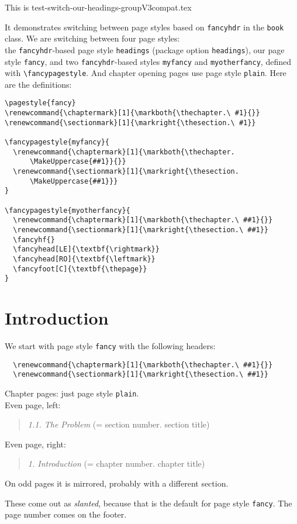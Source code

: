 \documentclass[openany]{book}
\renewcommand{\chaptermark}[1]{\markboth{\thechapter.\ #1}{}}
\renewcommand{\sectionmark}[1]{\markright{\thesection.\ #1}}
\renewcommand{\chaptermark}[1]{\markboth{\thechapter.
      \MakeUppercase{##1}}{}}
\renewcommand{\sectionmark}[1]{\markright{\thesection.
      \MakeUppercase{##1}}}
\renewcommand{\chaptermark}[1]{\markboth{\thechapter.\ ##1}{}}
\renewcommand{\sectionmark}[1]{\markright{\thesection.\ ##1}}
\begin{document}
\tableofcontents

\newpage
\thispagestyle{plain}

\noindent
\begin{boxedminipage}{\textwidth}
  This is test-switch-our-headings-groupV3compat.tex

It demonstrates switching between page styles based on
\texttt{fancyhdr} in the \texttt{book} class. We are switching between
four page styles:\\ the \texttt{fancyhdr}-based page style
\texttt{headings} (package option \texttt{headings}), our page style
\texttt{fancy}, and two \texttt{fancyhdr}-based styles \texttt{myfancy}
and \texttt{myotherfancy}, defined with \verb|\fancypagestyle|. And
chapter opening pages use page style \texttt{plain}.
  Here are the definitions:

\begin{verbatim}
\pagestyle{fancy}
\renewcommand{\chaptermark}[1]{\markboth{\thechapter.\ #1}{}}
\renewcommand{\sectionmark}[1]{\markright{\thesection.\ #1}}

\fancypagestyle{myfancy}{
  \renewcommand{\chaptermark}[1]{\markboth{\thechapter.
      \MakeUppercase{##1}}{}}
  \renewcommand{\sectionmark}[1]{\markright{\thesection.
      \MakeUppercase{##1}}}
}

\fancypagestyle{myotherfancy}{
  \renewcommand{\chaptermark}[1]{\markboth{\thechapter.\ ##1}{}}
  \renewcommand{\sectionmark}[1]{\markright{\thesection.\ ##1}}
  \fancyhf{}
  \fancyhead[LE]{\textbf{\rightmark}}
  \fancyhead[RO]{\textbf{\leftmark}}
  \fancyfoot[C]{\textbf{\thepage}}
}
\end{verbatim}
\end{boxedminipage}

\chapter{Introduction}

\noindent
\begin{boxedminipage}{\textwidth}
We start with page style \texttt{fancy} with the following headers:
\begin{verbatim}
  \renewcommand{\chaptermark}[1]{\markboth{\thechapter.\ ##1}{}}
  \renewcommand{\sectionmark}[1]{\markright{\thesection.\ ##1}}
\end{verbatim}
%
Chapter pages: just page style \texttt{plain}.
\\
Even page, left:
\begin{quote}
  \textsl{1.1. The Problem} (= section number. section title)
\end{quote}
Even page, right:
\begin{quote}
  \textsl{1. Introduction} (= chapter number. chapter title)
\end{quote}
On odd pages it is mirrored, probably with a different section.

These come out as \textsl{slanted}, because that is the default for page style \texttt{fancy}.
The page number comes on the footer.
\end{boxedminipage}
\bigskip
\end{document}

